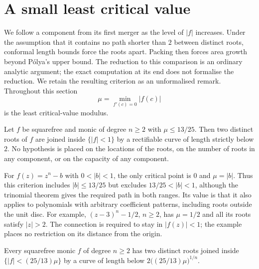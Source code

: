 \section{A small least critical value}
\label{sec:low-critical-closure}

We follow a component from its first merger as the level of $|f|$
increases. Under the assumption that it contains no path shorter than
$2$ between distinct roots, conformal length bounds force the roots
apart. Packing then forces area growth beyond P\'olya's upper bound.
The reduction to this comparison is an ordinary analytic argument;
the exact computation at its end does not formalise the reduction.
We retain the resulting criterion as an unformalised remark.
Throughout this section
\[
 \mu=\min_{f'(c)=0}|f(c)|
\]
is the least critical-value modulus.

\begin{remark}
\label{res:low-critical-thirteen-twentyfifths}
Let $f$ be squarefree and monic of degree $n\ge2$ with $\mu\le13/25$.  Then
two distinct roots of $f$ are joined inside $\{|f|<1\}$ by a rectifiable
curve of length strictly below $2$.  No hypothesis is placed on the locations
of the roots, on the number of roots in any component, or on the capacity of
any component.
\end{remark}


For $f(z)=z^n-b$ with $0<|b|<1$, the only critical point is $0$ and
$\mu=|b|$. Thus this criterion includes $|b|\le13/25$ but excludes
$13/25<|b|<1$, although the trinomial theorem gives the required path
in both ranges. Its value is that it also applies to polynomials with
arbitrary coefficient patterns, including roots outside the unit disc. For example,
$(z-3)^n-1/2$, $n\ge2$, has $\mu=1/2$ and all its roots satisfy
$|z|>2$. The connection is required to stay in $|f(z)|<1$; the example places
no restriction on its distance from the origin.

\begin{remark}
\label{res:low-critical-scale-free}
Every squarefree monic $f$ of degree $n\ge2$ has two distinct roots joined
inside $\{|f|<(25/13)\mu\}$ by a curve of length below
$2\bigl((25/13)\mu\bigr)^{1/n}$.
\end{remark}


